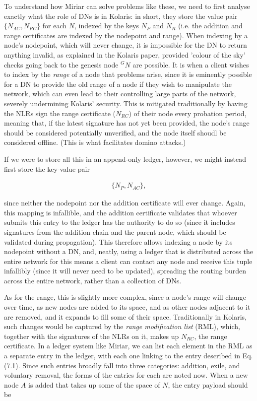 \documentclass{extreport}
\begin{document}
To understand how Miriar can solve problems like these, we need to first analyse exactly what the role of DNs is in Kolaris: in short, they store the value pair \(\{ N_{AC}, N_{RC} \}\) for each \(N\), indexed by the keys \(N_P\) and \(N_R\) (i.e. the addition and range certificates are indexed by the nodepoint and range). When indexing by a node's nodepoint, which will never change, it is impossible for the DN to return anything invalid, as explained in the Kolaris paper, provided 'colour of the sky' checks going back to the genesis node \(^GN\) are possible. It is when a client wishes to index by the \emph{range} of a node that problems arise, since it is eminently possible for a DN to provide the old range of a node if they wish to manipulate the network, which can even lead to their controlling large parts of the network, severely undermining Kolaris' security. This is mitigated traditionally by having the NLRs sign the range certificate (\(N_{RC}\)) of their node every probation period, meaning that, if the latest signature has not yet been provided, the node's range should be considered potentially unverified, and the node itself shoudl be considered offline. (This is what facilitates domino attacks.)

If we were to store all this in an append-only ledger, however, we might instead first store the key-value pair

\begin{align*}
\{ N_P, N_{AC} \}, \tag{7.1}
\end{align*}

since neither the nodepoint nor the addition certificate will ever change. Again, this mapping is infallible, and the addition certificate validates that whoever submits this entry to the ledger has the authority to do so (since it includes signatures from the addition chain and the parent node, which should be validated during propagation). This therefore allows indexing a node by its nodepoint without a DN, and, neatly, using a ledger that is distributed across the entire network for this means a client can contact any node and receive this tuple infallibly (since it will never need to be updated), spreading the routing burden across the entire network, rather than a collection of DNs.

As for the range, this is slightly more complex, since a node's range will change over time, as new nodes are added to its space, and as other nodes adjacent to it are removed, and it expands to fill some of their space. Traditionally in Kolaris, such changes would be captured by the \emph{range modification list} (RML), which, together with the signatures of the NLRs on it, makes up \(N_{RC}\), the range certificate. In a ledger system like Miriar, we can list each element in the RML as a separate entry in the ledger, with each one linking to the entry described in Eq. (7.1). Since such entries broadly fall into three categories: addition, exile, and voluntary removal, the forms of the entries for each are noted now. When a new node \(A\) is added that takes up some of the space of \(N\), the entry payload should be
\end{document}
